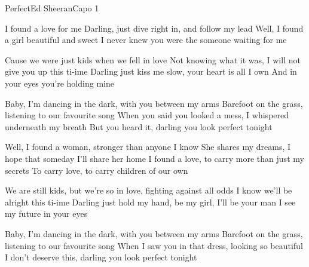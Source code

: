 \begin{song}{Perfect}{Ed Sheeran}{Capo 1}

I found a love for me
Darling, just dive right in, and follow my lead
Well, I found a girl beautiful and sweet
I never knew you were the someone waiting for me

Cause we were just kids when we fell in love
Not knowing what it was, I will not give you up this ti-ime
Darling just kiss me slow, your heart is all I own
And in your eyes you're holding mine

Baby, I'm dancing in the dark, with you between my arms
Barefoot on the grass, listening to our favourite song
When you said you looked a mess, I whispered underneath my breath
But you heard it, darling you look perfect tonight


Well, I found a woman, stronger than anyone I know
She shares my dreams, I hope that someday I'll share her home
I found a love, to carry more than just my secrets
To carry love, to carry children of our own


We are still kids, but we're so in love, fighting against all odds
I know we'll be alright this ti-ime
Darling just hold my hand, be my girl, I'll be your man
I see my future in your eyes

Baby, I'm dancing in the dark, with you between my arms
Barefoot on the grass, listening to our favourite song
When I saw you in that dress, looking so beautiful
I don't deserve this, darling you look perfect tonight


\end{song}
